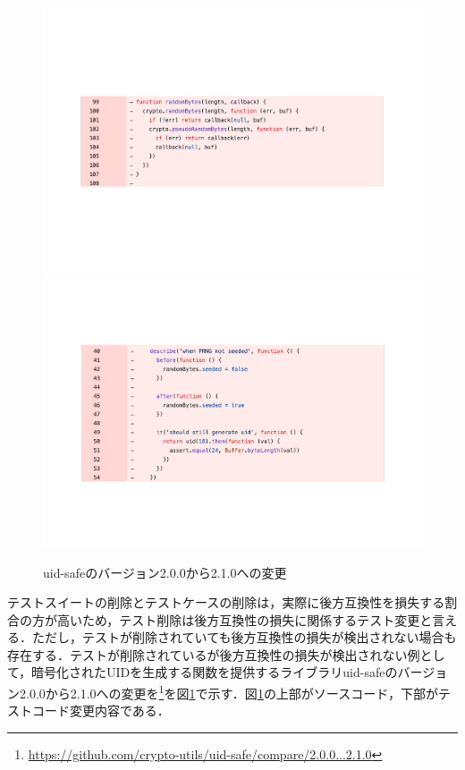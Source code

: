 \documentclass[11pt,dvipdfmx]{jreport}
\begin{document}
\begin{figure}[t]
  \label{fig:rq1.delete-test}
  \centering
  \includegraphics[width=1.0\linewidth]{fig/rq1/uuid/randomByte.pdf}
  \includegraphics[width=1.0\linewidth]{fig/rq1/uuid/randomByte.test.pdf}
  \caption{uid-safeのバージョン2.0.0から2.1.0への変更}
\end{figure}

テストスイートの削除とテストケースの削除は，実際に後方互換性を損失する割合の方が高いため，テスト削除は後方互換性の損失に関係するテスト変更と言える．ただし，テストが削除されていても後方互換性の損失が検出されない場合も存在する．テストが削除されているが後方互換性の損失が検出されない例として，暗号化されたUIDを生成する関数を提供するライブラリuid-safeのバージョン2.0.0から2.1.0への変更を\footnote{\url{https://github.com/crypto-utils/uid-safe/compare/2.0.0...2.1.0}}を図\ref{fig:rq1.delete-test}で示す．図\ref{fig:rq1.delete-test}の上部がソースコード，下部がテストコード変更内容である．
\end{document}
